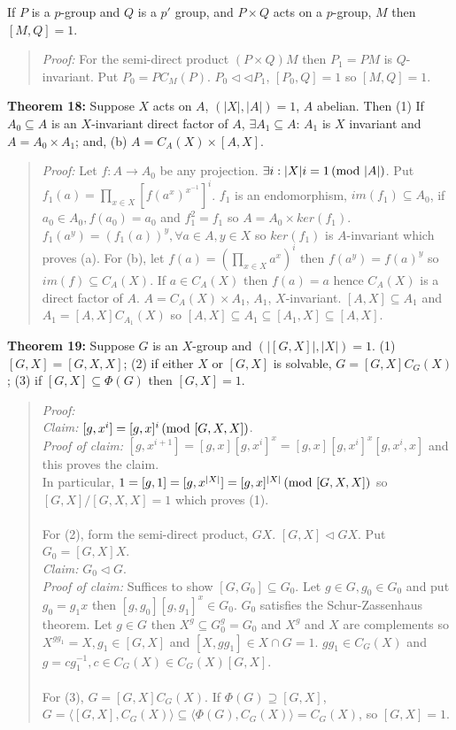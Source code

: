 If $P$ is a $p$-group and $Q$ is a $p'$ group, and $P \times Q$ acts on a $p$-group,
$M$ then $[M,Q] = 1$.
\begin{quote}
\emph{Proof:}
For the semi-direct product $(P \times Q)M$ then $P_1= PM$ is $Q$-invariant.  Put
$P_0=P C_M(P)$.  $P_0 \lhd \lhd P_1$, $[P_0, Q]= 1$ so $[M, Q] = 1$.
\end{quote}
{\bf Theorem 18:}
Suppose $X$ acts on $A$, $(|X|, |A|)= 1$, $A$ abelian.  Then
(1) If $A_0 \subseteq A$ is an $X$-invariant direct factor of $A$, $\exists A_1 \subseteq A$:
$A_1$ is $X$ invariant and $A= A_0 \times A_1$; and,
(b) $A= C_A(X) \times [A,X]$.
\begin{quote}
\emph{Proof:}
Let $f: A \rightarrow A_0$ be any projection.  $\exists i: |X|i= 1 \thinspace \textnormal{(mod } |A| \textnormal{)}$.
Put $f_1(a)= \prod_{x \in X} [f(a^x)^{x^{-1}}]^i$.
$f_1$ is an endomorphism, $im(f_1) \subseteq A_0$, if $a_0 \in A_0, f(a_0) =a_0$ and
$f_1^2= f_1$
so $A= A_0 \times ker(f_1)$.
$f_1(a^y)= (f_1(a))^y, \forall a \in A, y \in X$ so $ker(f_1)$ is $A$-invariant which proves (a).
For (b), let $f(a)= (\prod_{x \in X} a^x)^i$ then
$f(a^y)= f(a)^y$ so $im(f) \subseteq C_A(X)$.   If $a \in C_A(X)$ then
$f(a)=a$ hence $C_A(X)$ is a direct factor of $A$.
$A= C_A(X) \times A_1$, $A_1$, $X$-invariant.  $[A, X] \subseteq A_1$ and
$A_1= [A, X] C_{A_1}(X)$  so $[A, X] \subseteq A_1 \subseteq [A_1 , X] \subseteq [A, X]$.
\end{quote}
{\bf Theorem 19:}   Suppose $G$ is an $X$-group and $(|[G, X]|, |X|) = 1$.
(1) $[G,X]= [G, X, X]$; (2) if either $X$ or $[G, X]$ is solvable, $G= [G,X]C_G(X)$;
(3) if $[G, X] \subseteq \Phi(G)$ then
$[G, X] = 1$.
\begin{quote}
\emph{Proof:}
\\
\emph{Claim:} $[g, x^i] = [g, x]^i \thinspace \textnormal{(mod } [G, X, X] \textnormal{)}$.
\\
\emph{Proof of claim:} $[g, x^{i+1}] = 
[g, x] [g, x^i]^x = [g, x] [g, x^i]^x [g, x^i, x]$ and this proves the claim.
\\
In particular, $1 = [g,1] = 
[g, x^{|X|}]=
[g, x]^{|X|} \thinspace \textnormal{(mod } [G, X, X] \textnormal{)}$ so $[G,X]/[G,X,X] =1$ which proves (1).
\\
\\
For (2), form the semi-direct product, $GX$.  $[G,X] \lhd GX$.  Put $G_0 = [G, X]X$.
\\
\emph{Claim:} $G_0 \lhd G$.
\\
\emph{Proof of claim:}
Suffices to show $[G, G_0] \subseteq G_0$.  Let $g \in G, g_0 \in G_0$ and put
$g_0 = g_1 x$ then $[g, g_0] [g, g_1]^x \in G_0$.  $G_0$ satisfies the Schur-Zassenhaus theorem.
Let $g \in G$ then $X^g \subseteq G_0^g = G_0$ and $X^g$ and $X$ are complements so
$X^{g g_1} = X, g_1 \in [G, X]$ and $[X, g g_1] \in  X \cap G = 1$.
$g g_1 \in C_G(X)$ and $g= c g_1^{-1}, c \in C_G(X) \in C_G(X)[G,X]$.
\\
\\
For (3), $G= [G,X] C_G(X)$.  If $\Phi(G) \supseteq [G,X]$, 
$G= 
\langle [G, X], C_G(X) \rangle \subseteq
\langle \Phi(G), C_G(X) \rangle =  C_G(X)$, so $[G, X]= 1$.
\end{quote}
